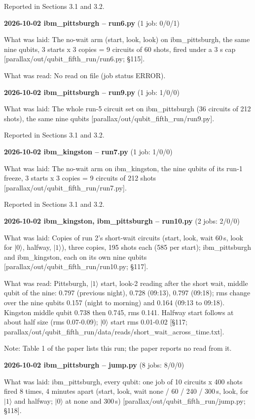 \documentclass[11pt]{article}
\begin{document}
Reported in Sections 3.1 and 3.2.

\textbf{2026-10-02 ibm\_pittsburgh -- run6.py} (1 job: 0/0/1)

What was laid: The no-wait arm (start, look, look) on ibm\_pittsburgh, the same nine qubits, 3 starts x 3 copies = 9 circuits of 60 shots, fired under a 3 s cap {[}parallax/out/qubit\_fifth\_run/run6.py; \S{}115{]}.

What was read: No read on file (job status ERROR).

\textbf{2026-10-02 ibm\_pittsburgh -- run9.py} (1 job: 1/0/0)

What was laid: The whole run-5 circuit set on ibm\_pittsburgh (36 circuits of 212 shots), the same nine qubits {[}parallax/out/qubit\_fifth\_run/run9.py{]}.

Reported in Sections 3.1 and 3.2.

\textbf{2026-10-02 ibm\_kingston -- run7.py} (1 job: 1/0/0)

What was laid: The no-wait arm on ibm\_kingston, the nine qubits of its run-1 freeze, 3 starts x 3 copies = 9 circuits of 212 shots {[}parallax/out/qubit\_fifth\_run/run7.py{]}.

Reported in Sections 3.1 and 3.2.

\textbf{2026-10-02 ibm\_kingston, ibm\_pittsburgh -- run10.py} (2 jobs: 2/0/0)

What was laid: Copies of run 2's short-wait circuits (start, look, wait 60\,\textmu s, look for \(|0\rangle\), halfway, \(|1\rangle\)), three copies, 195 shots each (585 per start); ibm\_pittsburgh and ibm\_kingston, each on its own nine qubits {[}parallax/out/qubit\_fifth\_run/run10.py; \S{}117{]}.

What was read: Pittsburgh, \(|1\rangle\) start, look-2 reading after the short wait, middle qubit of the nine: 0.797 (previous night), 0.728 (09:13), 0.797 (09:18); rms change over the nine qubits 0.157 (night to morning) and 0.164 (09:13 to 09:18). Kingston middle qubit 0.738 then 0.745, rms 0.141. Halfway start follows at about half size (rms 0.07-0.09); \(|0\rangle\) start rms 0.01-0.02 {[}\S{}117; parallax/out/qubit\_fifth\_run/data/reads/short\_wait\_across\_time.txt{]}.

Note: Table 1 of the paper lists this run; the paper reports no read from it.

\textbf{2026-10-02 ibm\_pittsburgh -- jump.py} (8 jobs: 8/0/0)

What was laid: ibm\_pittsburgh, every qubit: one job of 10 circuits x 400 shots fired 8 times, 4 minutes apart (start, look, wait none / 60 / 240 / 300\,\textmu s, look, for \(|1\rangle\) and halfway; \(|0\rangle\) at none and 300\,\textmu s) {[}parallax/out/qubit\_fifth\_run/jump.py; \S{}118{]}.
\end{document}
